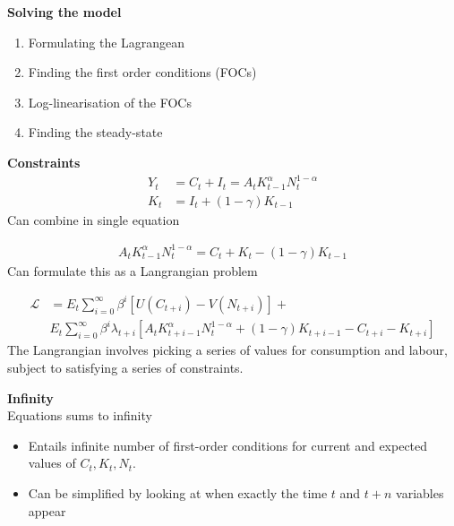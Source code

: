 \documentclass{beamer}
\begin{document}
\begin{frame}
 \textbf{Solving the model}
 \begin{enumerate}
  \item Formulating the Lagrangean
  \item Finding the first order conditions (FOCs)
  \item Log-linearisation of the FOCs
  \item Finding the steady-state
\end{enumerate}
\end{frame}

\begin{frame}
  \textbf{Constraints}  
\begin{align}
  Y_t &= C_t + I_t = A_tK^\alpha_{t-1}N^{1-\alpha}_t\\ \nonumber
  K_t &= I_t + (1-\gamma)K_{t-1}
\end{align}
 Can combine in single equation

\begin{align}
  A_tK^\alpha_{t-1}N^{1-\alpha}_t=C_t + K_t - (1-\gamma)K_{t-1}
\end{align}
Can formulate this as a Langrangian problem

\end{frame}

\begin{frame} 
\begin{align}
  \mathcal{L} &= E_t \sum^{\infty}_{i=0}\beta^i[U(C_{t+i}) - V(N_{t+i})] +\\ \nonumber
  & E_t \sum^{\infty}_{i=0}\beta^i \lambda_{t+i} [A_tK^\alpha_{t+i-1}N^{1-\alpha}_t + (1-\gamma)K_{t+i-1} - C_{t+i} - K_{t+i}]
\end{align}
 The Langrangian involves picking a series of values for consumption and labour, subject to satisfying a series of constraints. 
\end{frame}

\begin{frame}
  \textbf{Infinity}\\ 
  Equations sums to infinity
  \begin{itemize}
    \item Entails infinite number of first-order conditions for current and expected values of $C_t, K_t,N_t$.
    \item Can be simplified by looking at when exactly the time $t$ and $t+n$ variables appear
  \end{itemize}  
\end{frame}
\end{document}

